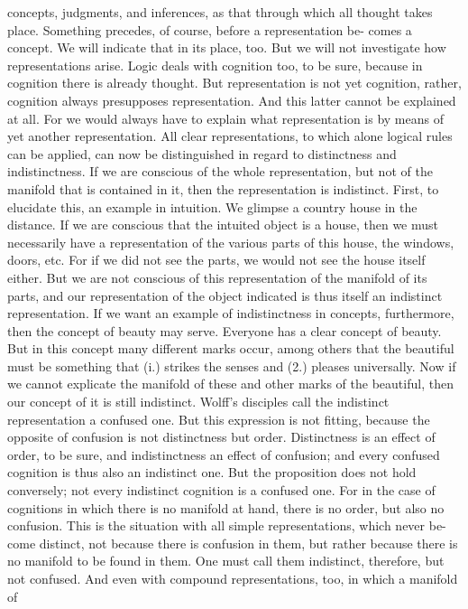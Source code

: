 concepts, judgments, and inferences, as that through which all thought
takes place. Something precedes, of course, before a representation be-
comes a concept. We will indicate that in its place, too. But we will not
investigate how representations arise. Logic deals with cognition too, to be
sure, because in cognition there is already thought. But representation is
not yet cognition, rather, cognition always presupposes representation.
And this latter cannot be explained at all. For we would always have to
explain what representation is by means of yet another representation.
All clear representations, to which alone logical rules can be applied,
can now be distinguished in regard to distinctness and indistinctness. If we
are conscious of the whole representation, but not of the manifold that is
contained in it, then the representation is indistinct. First, to elucidate
this, an example in intuition.
We glimpse a country house in the distance. If we are conscious that the
intuited object is a house, then we must necessarily have a representation of
the various parts of this house, the windows, doors, etc. For if we did not see
the parts, we would not see the house itself either. But we are not conscious
of this representation of the manifold of its parts, and our representation of
the object indicated is thus itself an indistinct representation.
If we want an example of indistinctness in concepts, furthermore, then
the concept of beauty may serve. Everyone has a clear concept of beauty.
But in this concept many different marks occur, among others that the
beautiful must be something that (i.) strikes the senses and (2.) pleases
universally. Now if we cannot explicate the manifold of these and other
marks of the beautiful, then our concept of it is still indistinct.
Wolff's disciples call the indistinct representation a confused one. But
this expression is not fitting, because the opposite of confusion is not
distinctness but order. Distinctness is an effect of order, to be sure, and
indistinctness an effect of confusion; and every confused cognition is thus
also an indistinct one. But the proposition does not hold conversely; not
every indistinct cognition is a confused one. For in the case of cognitions
in which there is no manifold at hand, there is no order, but also no
confusion.
This is the situation with all simple representations, which never be-
come distinct, not because there is confusion in them, but rather because
there is no manifold to be found in them. One must call them indistinct,
therefore, but not confused.
And even with compound representations, too, in which a manifold of
